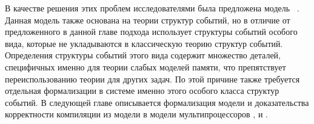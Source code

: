 В качестве решения этих проблем исследователями 
была предложена модель \Wkm~\cite{Chakraborty-Vafeiadis:POPL19}.
Данная модель также основана на теории структур событий, 
но в отличие от предложенного в данной главе подхода 
использует структуры событий особого вида, 
которые не укладываются в классическую теорию структур событий.
Определения структуры событий этого вида 
содержит множество деталей, специфичных именно для теории слабых моделей памяти, 
что препятствует переиспользованию теории для других задач.  
По этой причине также требуется отдельная формализации в системе \coq 
именно этого особого класса структур событий. 
В следующей главе описывается формализация 
модели \Wkm и доказательства корректности компиляции
из модели \Wkm в модели мультипроцессоров \TSO, \ARM и \POWER.
